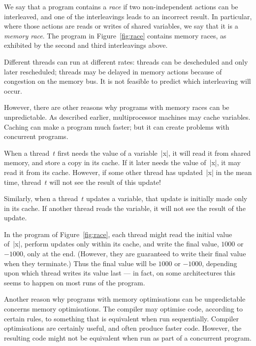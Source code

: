 We say that a program contains a \emph{race} if two non-independent actions
can be interleaved, and one of the interleavings leads to an incorrect
result.  In particular, where those actions are reads or writes of shared
variables, we say that it is a \emph{memory race}.  The program in
Figure~\ref{fig:race} contains memory races, as exhibited by the second and
third interleavings above. 

Different threads can run at different rates: threads can be descheduled and
only later rescheduled; threads may be delayed in memory actions because of
congestion on the memory bus.  It is not feasible to predict which
interleaving will occur.



However, there are other reasons why programs with memory races can be
unpredictable.  
%
As described earlier, multiprocessor machines may cache variables.  Caching
can make a program much faster; but it can create problems with concurrent
programs.

When a thread~$t$ first needs the value of a variable~|x|, it will read it
from shared memory, and store a copy in its cache.  If it later needs the
value of~|x|, it may read it from its cache.  However, if some other thread
has updated~|x| in the mean time, thread~$t$ will not see the result of this
update!

Similarly, when a thread~$t$ updates a variable, that update is initially made
only in its cache.  If another thread reads the variable, it will not see the
result of the update.

In the program of Figure~\ref{fig:race}, each thread might read the initial
value of~|x|, perform updates only within its cache, and write the final
value, $1000$ or $-1000$, only at the end.  (However, they are guaranteed to
write their final value when they terminate.)  Thus the final value will be
$1000$ or $-1000$, depending upon which thread writes its value last --- in
fact, on some architectures this seems to happen on most runs of the program.


Another reason why programs with memory optimisations can be unpredictable
concerns memory optimisations.  The compiler may optimise code, according to
certain rules, to something that is equivalent when run sequentially.
Compiler optimisations are certainly useful, and often produce faster code.
However, the resulting code might not be equivalent when run as part of a
concurrent program.

